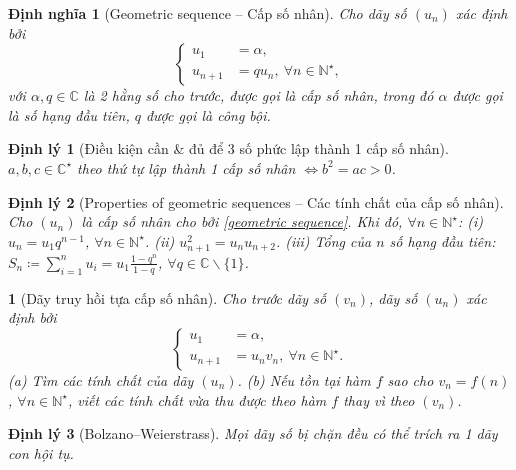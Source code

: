 \documentclass{article}
\newtheorem{baitoan}{}
\newtheorem{dinhly}{Định lý}
\newtheorem{dinhnghia}{Định nghĩa}
\begin{document}
\begin{dinhnghia}[Geometric sequence -- Cấp số nhân]
	Cho dãy số $(u_n)$ xác định bởi
	\begin{equation}
		\label{geometric sequence}
		\tag{csn}
		\left\{\begin{split}
			u_1 &= \alpha,\\
			u_{n+1} &= qu_n,\ \forall n\in\mathbb{N}^\star,
		\end{split}\right.
	\end{equation}
	với $\alpha,q\in\mathbb{C}$ là 2 hằng số cho trước, được gọi là {\rm cấp số nhân}, trong đó $\alpha$ được gọi là {\rm số hạng đầu tiên}, $q$ được gọi là {\rm công bội}.
\end{dinhnghia}

\begin{dinhly}[Điều kiện cần \& đủ để 3 số phức lập thành 1 cấp số nhân]
	$a,b,c\in\mathbb{C}^\star$ theo thứ tự lập thành 1 cấp số nhân $\Leftrightarrow b^2 = ac > 0$.
\end{dinhly}

\begin{dinhly}[Properties of geometric sequences -- Các tính chất của cấp số nhân]
	\label{thm: properties of geometric sequences}
	Cho $(u_n)$ là cấp số nhân cho bởi \eqref{geometric sequence}. Khi đó, $\forall n\in\mathbb{N}^\star$: (i) $u_n = u_1q^{n-1}$, $\forall n\in\mathbb{N}^\star$. (ii) $u_{n+1}^2 = u_nu_{n+2}$. (iii) Tổng của $n$ số hạng đầu tiên: $S_n\coloneqq\sum_{i=1}^n u_i = u_1\frac{1 - q^n}{1 - q}$, $\forall q\in\mathbb{C}\backslash\{1\}$.
\end{dinhly}

\begin{baitoan}[Dãy truy hồi tựa cấp số nhân]
	Cho trước dãy số $(v_n)$, dãy số $(u_n)$ xác định bởi
	\begin{equation*}
		\left\{\begin{split}
			u_1 &= \alpha,\\
			u_{n+1} &= u_nv_n,\ \forall n\in\mathbb{N}^\star.
		\end{split}\right.
	\end{equation*}
	(a) Tìm các tính chất của dãy $(u_n)$. (b) Nếu tồn tại hàm $f$ sao cho $v_n = f(n)$, $\forall n\in\mathbb{N}^\star$, viết các tính chất vừa thu được theo hàm $f$ thay vì theo $(v_n)$.
\end{baitoan}

\begin{dinhly}[Bolzano--Weierstrass]
	Mọi dãy số bị chặn đều có thể trích ra 1 dãy con hội tụ.
\end{dinhly}
\end{document}
